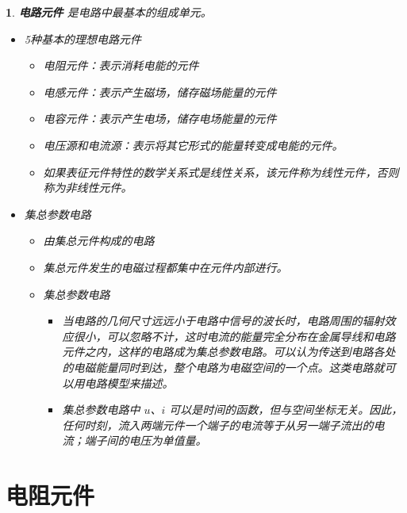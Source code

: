 \documentclass[UTF8]{report}
\theoremstyle{MyLineTheoremStyle} %
\theoremstyle{MyBlockTheoremStyle} %
\theoremstyle{MySubsubsectionStyle} %
\newtheorem{definition}{}
\begin{document}
\begin{definition}
    \textbf{电路元件} 是电路中最基本的组成单元。
    \begin{itemize}
        \item 5种基本的理想电路元件
        \begin{itemize}
            \item 电阻元件：表示消耗电能的元件
            \item 电感元件：表示产生磁场，储存磁场能量的元件
            \item 电容元件：表示产生电场，储存电场能量的元件
            \item 电压源和电流源：表示将其它形式的能量转变成电能的元件。
            \item 如果表征元件特性的数学关系式是线性关系，该元件称为线性元件，否则称为非线性元件。
        \end{itemize}
        \item 集总参数电路
        \begin{itemize}
            \item 由集总元件构成的电路
            \item 集总元件发生的电磁过程都集中在元件内部进行。
            \item 集总参数电路
            \begin{itemize}
                \item 当电路的几何尺寸远远小于电路中信号的波长时，电路周围的辐射效应很小，可以忽略不计，这时电流的能量完全分布在金属导线和电路元件之内，这样的电路成为集总参数电路。可以认为传送到电路各处的电磁能量同时到达，整个电路为电磁空间的一个点。这类电路就可以用电路模型来描述。
                \item 集总参数电路中 $u$、$i$ 可以是时间的函数，但与空间坐标无关。因此，任何时刻，流入两端元件一个端子的电流等于从另一端子流出的电流；端子间的电压为单值量。
            \end{itemize}
        \end{itemize}
    \end{itemize}
\end{definition}

\section{电阻元件}
\end{document}
